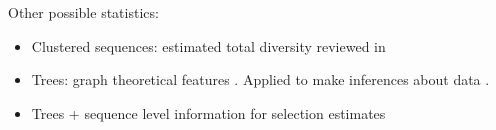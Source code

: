 
Other possible statistics:

\begin{itemize}
\item Clustered sequences: estimated total diversity reviewed in \cite{Mehr2012-se}
\item Trees: graph theoretical features \cite{Dunn-Walters2002-cu,Dunn-Walters2004-hv,Mehr2004-ej,Shahaf2008-cc,Budeus2015-ab,Yaari2015-ss}.
Applied to make inferences about data \cite{Steiman-Shimony2006-fm}.
\item Trees + sequence level information for selection estimates \cite{Uduman2014-pb}
\end{itemize}




